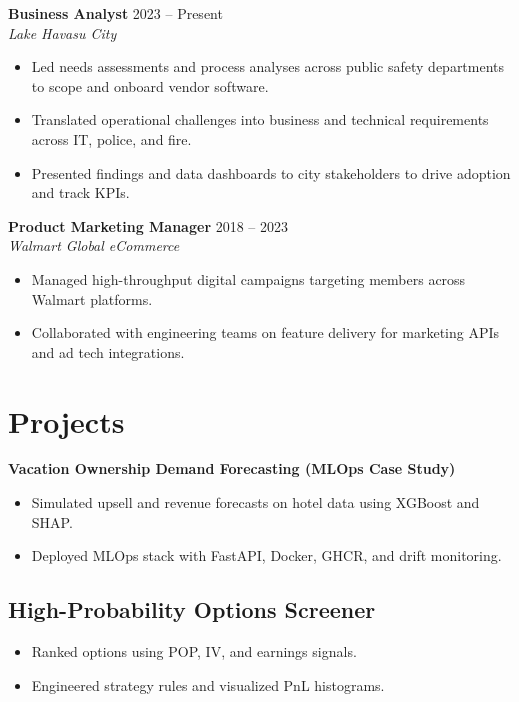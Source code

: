 \documentclass[a4paper,10pt]{article}
\begin{document}
\textbf{Business Analyst} \hfill 2023 -- Present \\
\textit{Lake Havasu City} \\
\begin{itemize}[leftmargin=*, itemsep=2pt, parsep=0pt]
    \item Led needs assessments and process analyses across public safety departments to scope and onboard vendor software.
    \item Translated operational challenges into business and technical requirements across IT, police, and fire.
    \item Presented findings and data dashboards to city stakeholders to drive adoption and track KPIs.
\end{itemize}

\textbf{Product Marketing Manager} \hfill 2018 -- 2023 \\
\textit{Walmart Global eCommerce} \\
\begin{itemize}[leftmargin=*, itemsep=2pt, parsep=0pt]
    \item Managed high-throughput digital campaigns targeting members across Walmart platforms.
    \item Collaborated with engineering teams on feature delivery for marketing APIs and ad tech integrations.
\end{itemize}

\section*{Projects}

\textbf{Vacation Ownership Demand Forecasting (MLOps Case Study)} \\
\begin{itemize}[leftmargin=*, itemsep=2pt, parsep=0pt]
    \item Simulated upsell and revenue forecasts on hotel data using XGBoost and SHAP.
    \item Deployed MLOps stack with FastAPI, Docker, GHCR, and drift monitoring.
\end{itemize}

\subsection*{High-Probability Options Screener}
\begin{itemize}[leftmargin=*, itemsep=2pt, parsep=0pt]
    \item Ranked options using POP, IV, and earnings signals.
    \item Engineered strategy rules and visualized PnL histograms.
\end{itemize}
\end{document}
